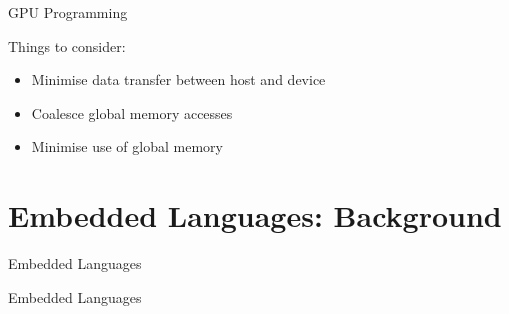 \documentclass[xcolor=dvipsnames]{beamer}
\begin{document}
\begin{frame}{GPU Programming} 

  Things to consider:

  \begin{itemize} 
    \item Minimise data transfer between host and device
    \item Coalesce global memory accesses
    \item Minimise use of global memory 
  \end{itemize} 
  
\end{frame} 


%
\section{Embedded Languages: Background}


\begin{frame}{Embedded Languages} 
 \begin{center}
   {\Large Embedded Languages}
 \end{center}

\end{frame} 
\end{document}
